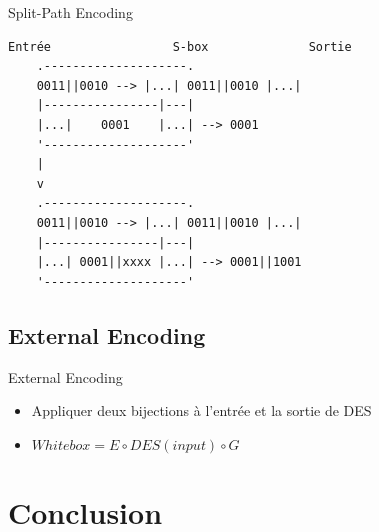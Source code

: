 \documentclass{beamer}
\begin{document}
\begin{frame}[fragile]{Split-Path Encoding}
  \begin{Verbatim}[samepage=true]
    Entrée                 S-box              Sortie
    .--------------------.
    0011||0010 --> |...| 0011||0010 |...|
    |----------------|---|
    |...|    0001    |...| --> 0001
    '--------------------'
    | 
    v
    .--------------------.
    0011||0010 --> |...| 0011||0010 |...|
    |----------------|---|
    |...| 0001||xxxx |...| --> 0001||1001
    '--------------------'
  \end{Verbatim}
  
\end{frame}

\subsection{External Encoding}

\begin{frame}{External Encoding}
  \begin{center}
    \begin{itemize}
    \item Appliquer deux bijections à l'entrée et la sortie de DES
    \item $Whitebox = E \circ DES(input) \circ G$
    \end{itemize}
  \end{center}

\end{frame}

\section{Conclusion}
\end{document}
